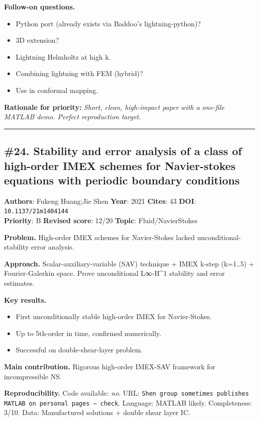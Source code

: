 \documentclass[10pt,letterpaper]{article}
\begin{document}
\textbf{Follow-on questions.}
\begin{itemize}
\item Python port (already exists via Baddoo's lightning-python)?
\item 3D extension?
\item Lightning Helmholtz at high k.
\item Combining lightning with FEM (hybrid)?
\item Use in conformal mapping.
\end{itemize}

\textbf{Rationale for priority:} \emph{Short, clean, high-impact paper with a one-file MATLAB demo. Perfect reproduction target.}

\medskip\hrule\medskip

\subsection*{\#24. Stability and error analysis of a class of high-order IMEX schemes for Navier-stokes equations with periodic boundary conditions}
\textbf{Authors}: Fukeng Huang;Jie Shen \textbullet{} \textbf{Year}: 2021 \textbullet{} \textbf{Cites}: 43 \textbullet{} \textbf{DOI}: \texttt{10.1137/21m1404144} \\
\textbf{Priority}: B \textbullet{} \textbf{Revised score}: 12/20 \textbullet{} \textbf{Topic}: Fluid/NavierStokes

\textbf{Problem.} High-order IMEX schemes for Navier-Stokes lacked unconditional-stability error analysis.

\textbf{Approach.} Scalar-auxiliary-variable (SAV) technique + IMEX k-step (k=1..5) + Fourier-Galerkin space. Prove unconditional L∞-H\^{}1 stability and error estimates.

\textbf{Key results.}
\begin{itemize}
\item First unconditionally stable high-order IMEX for Navier-Stokes.
\item Up to 5th-order in time, confirmed numerically.
\item Successful on double-shear-layer problem.
\end{itemize}

\textbf{Main contribution.} Rigorous high-order IMEX-SAV framework for incompressible NS.

\textbf{Reproducibility.} Code available: \emph{no}. URL: \texttt{Shen group sometimes publishes MATLAB on personal pages — check}. Language: MATLAB likely. Completeness: 3/10. Data: Manufactured solutions + double shear layer IC.
\end{document}
